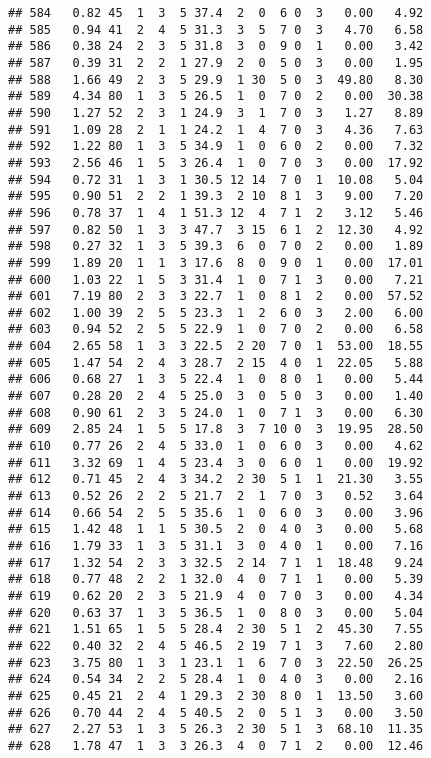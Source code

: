 \documentclass[
]{article}
\begin{document}
\begin{verbatim}
## 584   0.82 45  1  3  5 37.4  2  0  6 0  3   0.00   4.92
## 585   0.94 41  2  4  5 31.3  3  5  7 0  3   4.70   6.58
## 586   0.38 24  2  3  5 31.8  3  0  9 0  1   0.00   3.42
## 587   0.39 31  2  2  1 27.9  2  0  5 0  3   0.00   1.95
## 588   1.66 49  2  3  5 29.9  1 30  5 0  3  49.80   8.30
## 589   4.34 80  1  3  5 26.5  1  0  7 0  2   0.00  30.38
## 590   1.27 52  2  3  1 24.9  3  1  7 0  3   1.27   8.89
## 591   1.09 28  2  1  1 24.2  1  4  7 0  3   4.36   7.63
## 592   1.22 80  1  3  5 34.9  1  0  6 0  2   0.00   7.32
## 593   2.56 46  1  5  3 26.4  1  0  7 0  3   0.00  17.92
## 594   0.72 31  1  3  1 30.5 12 14  7 0  1  10.08   5.04
## 595   0.90 51  2  2  1 39.3  2 10  8 1  3   9.00   7.20
## 596   0.78 37  1  4  1 51.3 12  4  7 1  2   3.12   5.46
## 597   0.82 50  1  3  3 47.7  3 15  6 1  2  12.30   4.92
## 598   0.27 32  1  3  5 39.3  6  0  7 0  2   0.00   1.89
## 599   1.89 20  1  1  3 17.6  8  0  9 0  1   0.00  17.01
## 600   1.03 22  1  5  3 31.4  1  0  7 1  3   0.00   7.21
## 601   7.19 80  2  3  3 22.7  1  0  8 1  2   0.00  57.52
## 602   1.00 39  2  5  5 23.3  1  2  6 0  3   2.00   6.00
## 603   0.94 52  2  5  5 22.9  1  0  7 0  2   0.00   6.58
## 604   2.65 58  1  3  3 22.5  2 20  7 0  1  53.00  18.55
## 605   1.47 54  2  4  3 28.7  2 15  4 0  1  22.05   5.88
## 606   0.68 27  1  3  5 22.4  1  0  8 0  1   0.00   5.44
## 607   0.28 20  2  4  5 25.0  3  0  5 0  3   0.00   1.40
## 608   0.90 61  2  3  5 24.0  1  0  7 1  3   0.00   6.30
## 609   2.85 24  1  5  5 17.8  3  7 10 0  3  19.95  28.50
## 610   0.77 26  2  4  5 33.0  1  0  6 0  3   0.00   4.62
## 611   3.32 69  1  4  5 23.4  3  0  6 0  1   0.00  19.92
## 612   0.71 45  2  4  3 34.2  2 30  5 1  1  21.30   3.55
## 613   0.52 26  2  2  5 21.7  2  1  7 0  3   0.52   3.64
## 614   0.66 54  2  5  5 35.6  1  0  6 0  3   0.00   3.96
## 615   1.42 48  1  1  5 30.5  2  0  4 0  3   0.00   5.68
## 616   1.79 33  1  3  5 31.1  3  0  4 0  1   0.00   7.16
## 617   1.32 54  2  3  3 32.5  2 14  7 1  1  18.48   9.24
## 618   0.77 48  2  2  1 32.0  4  0  7 1  1   0.00   5.39
## 619   0.62 20  2  3  5 21.9  4  0  7 0  3   0.00   4.34
## 620   0.63 37  1  3  5 36.5  1  0  8 0  3   0.00   5.04
## 621   1.51 65  1  5  5 28.4  2 30  5 1  2  45.30   7.55
## 622   0.40 32  2  4  5 46.5  2 19  7 1  3   7.60   2.80
## 623   3.75 80  1  3  1 23.1  1  6  7 0  3  22.50  26.25
## 624   0.54 34  2  2  5 28.4  1  0  4 0  3   0.00   2.16
## 625   0.45 21  2  4  1 29.3  2 30  8 0  1  13.50   3.60
## 626   0.70 44  2  4  5 40.5  2  0  5 1  3   0.00   3.50
## 627   2.27 53  1  3  5 26.3  2 30  5 1  3  68.10  11.35
## 628   1.78 47  1  3  3 26.3  4  0  7 1  2   0.00  12.46

\end{verbatim}
\end{document}
